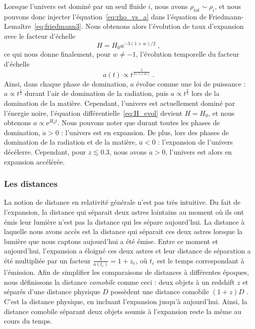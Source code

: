 Lorsque l'univers est dominé par un seul fluide $i$, nous avons $\rho_{tot} \sim \rho_{i}$, et nous pouvons donc injecter l'équation~\ref{eq:rho_vs_a} dans l'équation de Friedmann-Lemaître~\ref{eq:friedmann3}. Nous obtenons alors l'évolution de taux d'expansion avec le facteur d'échelle
\begin{equation}
  \label{eq:H_evol}
  H = H_0 a^{-3 (1+w) / 2}  \; ,
\end{equation}
ce qui nous donne finalement, pour $w \neq -1$, l'évolution temporelle du facteur d'échelle
\begin{equation}
  \label{eq:a_vs_t}
  a(t) \propto t^{\frac{2}{3(1+w)}}  \; .
\end{equation}
Ainsi, dans chaque phase de domination, $a$ évolue comme une loi de puissance : $a \propto t^{\frac{1}{2}}$ durant l'air de domination de la radiation, puis $a \propto t^{\frac{2}{3}}$ lors de la domination de la matière. Cependant, l'univers est actuellement dominé par l'énergie noire, l'équation différentielle~\ref{eq:H_evol} devient $H = H_0$, et nous obtenons $a \propto \mathrm{e}^{H_{0} t}$. Nous pouvons noter que durant toutes les phases de domination, $\dot a > 0$ : l'univers est en expansion. De plus, lors des phases de domination de la radiation et de la matière, $\ddot a < 0$ : l'expansion de l'univers décélerre. Cependant, pour $ z \lesssim \num{0.3}$, nous avons $\ddot a > 0$, l'univers est alors en expansion accélérée.

\subsubsection{Les distances}
La notion de distance en relativité générale n'est pas très intuitive.
Du fait de l'expansion, la distance qui séparait deux astres lointains au moment où ils ont émis leur lumière n'est pas la distance qui les sépare aujourd'hui.
La distance à laquelle nous avons accès est la distance qui séparait ces deux astres lorsque la lumière que nous captons aujourd'hui a été émise. Entre ce moment et aujourd'hui, l'expansion a éloigné ces deux astres et leur distance de séparation a été multipliée par un facteur $\frac{1}{a(t_e)} = 1 + z_{e}$, où $t_e$ est le temps correspondant à l'émission.
Afin de simplifier les comparaisons de distances à différentes époques, nous définissons la distance \emph{comobile} comme ceci : deux objets à un redshift $z$ et séparés d'une distance physique $D$ possèdent une distance comobile $(1+z)D$ . C'est la distance physique, en incluant l'expansion jusqu'à aujourd'hui. Ainsi, la distance comobile séparant deux objets soumis à l'expansion reste la même au cours du temps.

